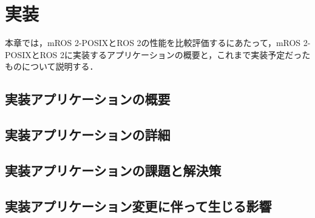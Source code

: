 \chapter{実装}
\label{chap:implementation}
本章では，mROS 2-POSIXとROS 2の性能を比較評価するにあたって，mROS 2-POSIXとROS 2に実装するアプリケーションの概要と，これまで実装予定だったものについて説明する．
\section{実装アプリケーションの概要}

\section{実装アプリケーションの詳細}

\section{実装アプリケーションの課題と解決策}

\section{実装アプリケーション変更に伴って生じる影響}


